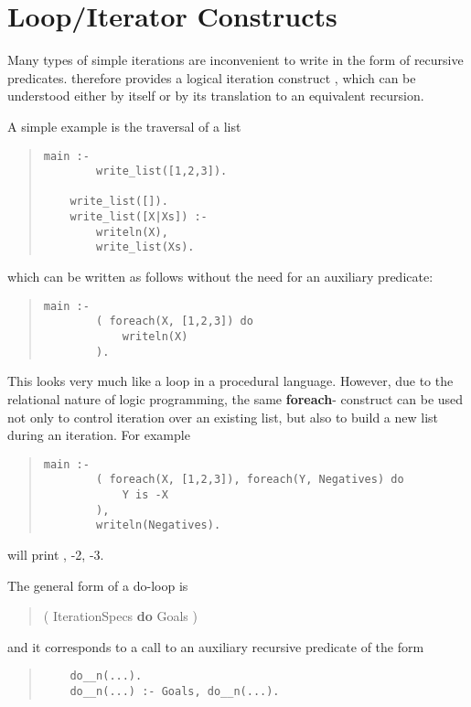 \section{Loop/Iterator Constructs}
\label{doloops}%
%
%
Many types of simple iterations are inconvenient to write in the
form of recursive predicates. {\eclipse} therefore provides a logical
iteration construct
,
which can be understood either by itself
or by its translation to an equivalent recursion.

A simple example is the traversal of a list
\begin{quote}\begin{verbatim}
main :-
        write_list([1,2,3]).

    write_list([]).
    write_list([X|Xs]) :-
        writeln(X),
        write_list(Xs).
\end{verbatim}\end{quote}
which can be written as follows without the need for an auxiliary predicate:
\begin{quote}\begin{verbatim}
main :-
        ( foreach(X, [1,2,3]) do
            writeln(X)
        ).
\end{verbatim}\end{quote}
This looks very much like a loop in a procedural language. However,
due to the relational nature of logic programming, the same {\bf foreach}-
construct can be used not only to control iteration over an existing list, 
but also to build a new list during an iteration. For example
\begin{quote}\begin{verbatim}
main :-
        ( foreach(X, [1,2,3]), foreach(Y, Negatives) do
            Y is -X
        ),
        writeln(Negatives).
\end{verbatim}\end{quote}
will print , -2, -3\rbr.

The general form of a do-loop is
\begin{quote}
( IterationSpecs {\bf do} Goals )
\end{quote}
and it corresponds to a call to an auxiliary recursive
predicate of the form
\begin{quote}\begin{verbatim}
    do__n(...).
    do__n(...) :- Goals, do__n(...).
\end{verbatim}\end{quote}

